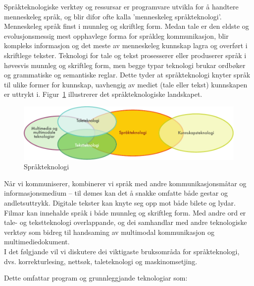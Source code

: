 \clearpage


\begin{multicols}{2}

Språkteknologiske verktøy og ressursar er programvare utvikla for å handtere menneskeleg språk, og blir difor ofte kalla 'menneskeleg språkteknologi'. 
Menneskeleg språk finst i munnleg og skriftleg form. Medan tale er den eldste og evolusjonsmessig mest opphavlege forma for språkleg kommunikasjon, blir kompleks informasjon og det meste av menneskeleg kunnskap lagra og overført i skriftlege tekster. Teknologi for tale og tekst prosesserer eller produserer språk i høvesvis munnleg og skriftleg form, men begge typar teknologi brukar ordbøker og grammatiske og semantiske reglar. Dette tyder at språkteknologi knyter språk til ulike former for kunnskap, uavhengig av mediet (tale eller tekst) kunnskapen er uttrykt i. Figur~\ref{fig:ltincontext_no} illustrerer det språkteknologiske landskapet.

\begin{figure}[htb]
  \center
  \includegraphics[width=\textwidth]{../_media/norwegian-nynorsk/language_technologies}
  \caption{Språkteknologi}
  \label{fig:ltincontext_no}
\end{figure}

Når vi kommuniserer, kombinerer vi språk med andre kommunikasjonsmåtar og informasjonsmedium – til dømes kan det å snakke omfatte både gestar og andletsuttrykk. Digitale tekster kan knyte seg opp mot både bilete og lydar. Filmar kan innehalde språk i både munnleg og skriftleg form. Med andre ord er tale- og tekstteknologi overlappande, og dei samhandlar med andre teknologiske verktøy som bidreg til handsaming av multimodal kommunikasjon og multimediedokument.\\ 
I det følgjande vil vi diskutere dei viktigaste bruksområda for språkteknologi, dvs. korrekturlesing, nettsøk, taleteknologi og maskinomsetjing. 

Dette omfattar program og grunnleggjande teknologiar som:


\end{multicols}
